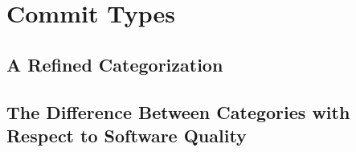 \section{Commit Types}
\subsection{A Refined Categorization}
\subsection{The Difference Between Categories with Respect to Software Quality}